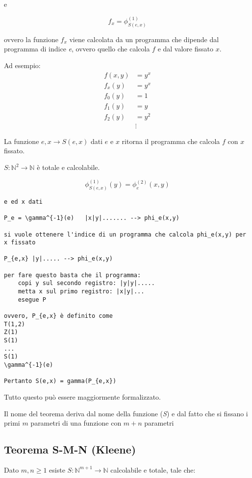 e 

$$
f_x = \phi_{S(e,x)}^{(1)}
$$

ovvero la funzione $ f_x $ viene calcolata da un programma che dipende dal programma di indice \textit{e}, ovvero quello che calcola $ f $ e dal valore fissato $ x $.

Ad esempio:
\begin{align*}
f(x,y) &= y^x \\
f_x(y) &= y^x \\
f_0(y) &= 1 \\
f_1(y) &= y \\
f_2(y) &= y^2 \\
&\vdots 
\end{align*}

La funzione $ e,x \rightarrow S(e,x) $ dati $ e $ e $ x $ ritorna il programma che calcola $ f $ con $ x $ fissato.

$ S : \mathbb{N}^2 \rightarrow \mathbb{N} $ è totale e calcolabile.

$$
\phi_{S(e,x)}^{(1)}(y) = \phi_{e}^{(2)}(x,y)
$$

\begin{verbatim}
e ed x dati

P_e = \gamma^{-1}(e)   |x|y|....... --> phi_e(x,y)

si vuole ottenere l'indice di un programma che calcola phi_e(x,y) per x fissato

P_{e,x} |y|..... --> phi_e(x,y)

per fare questo basta che il programma:
	copi y sul secondo registro: |y|y|.....
	metta x sul primo registro: |x|y|...
	esegue P

ovvero, P_{e,x} è definito come
T(1,2)
Z(1)
S(1)
...
S(1)
\gamma^{-1}(e)

Pertanto S(e,x) = gamma(P_{e,x})
\end{verbatim}

Tutto questo può essere maggiormente formalizzato.

Il nome del teorema deriva dal nome della funzione (\textit{S}) e dal fatto che si fissano i primi $ m $ parametri di una funzione con $ m+n $ parametri

\subsection{Teorema S-M-N (Kleene)}

Dato $ m,n \geq 1 $ esiste $ S : \mathbb{N}^{m+1} \rightarrow  \mathbb{N}$ calcolabile e totale, tale che:

